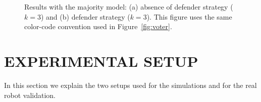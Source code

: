 \documentclass[sigconf]{acmart}
\begin{document}
\begin{figure}
  \centering
  \hfill
  \caption{Results with the majority model: (a)  absence of defender strategy  ($k=3$) and (b) defender strategy ($k=3$). This figure uses the same color-code convention used in Figure~\ref{fig:voter}.}
  \label{fig:majority1}
\end{figure}

  

\section{EXPERIMENTAL SETUP}
\label{sec:expsetup}
In this section we explain the two setups used for the simulations and for the real robot validation.
\end{document}
